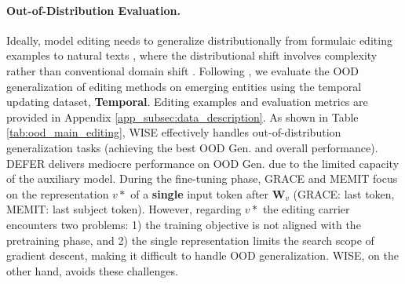 \paragraph{Out-of-Distribution Evaluation.} 
Ideally, model editing needs to generalize distributionally from formulaic editing examples to natural texts \cite{canonical_examples}, where the distributional shift involves complexity rather than conventional domain shift \cite{domain_shift}.
Following \citep{canonical_examples}, we evaluate the OOD generalization of editing methods on emerging entities using the temporal updating dataset, \textbf{Temporal}. 
Editing examples and evaluation metrics are provided in Appendix \ref{app_subsec:data_description}.
As shown in Table \ref{tab:ood_main_editing}, WISE effectively handles out-of-distribution generalization tasks (achieving the best OOD Gen. and overall performance).
DEFER delivers mediocre performance on OOD Gen. due to the limited capacity of the auxiliary model\cite{knowledge_editing_survey_1}.
During the fine-tuning phase, GRACE and MEMIT focus on the representation $v*$ of a \textbf{single} input token after $\mathbf{W}_v$ (GRACE: last token, MEMIT: last subject token).
However, regarding $v*$ the editing carrier encounters two problems: 1) the training objective is not aligned with the pretraining phase, and 2) the single representation limits the search scope of gradient descent, making it difficult to handle OOD generalization. WISE, on the other hand, avoids these challenges.


